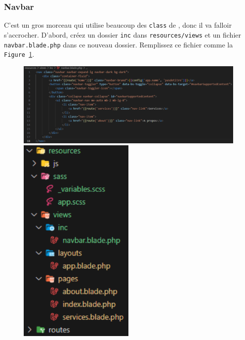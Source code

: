 \documentclass[internal]{nhitec_design}
\begin{document}
\subsubsection{Navbar}

C'est un gros morceau qui utilise beaucoup des \verb|class| de \bs{}, donc il va falloir s'accrocher. D'abord, créez un dossier \verb|inc| dans \verb|resources/views| et un fichier \verb|navbar.blade.php| dans ce nouveau dossier. Remplissez ce fichier comme la \texttt{Figure~\ref{fig:navbar}}.

\begin{figure}[!h]
    \centering
    \begin{minipage}{0.7\textwidth}
         \centering
         \includegraphics[width=\textwidth]{figures-C1/navbar.pdf}
         \caption{\label{fig:navbar}}
    \end{minipage}
    \begin{minipage}{0.28\textwidth}
         \centering
         \includegraphics[width=0.5\textwidth]{figures-C1/navbar_file.pdf}
         \caption{}
    \end{minipage}
\end{figure}
\end{document}
